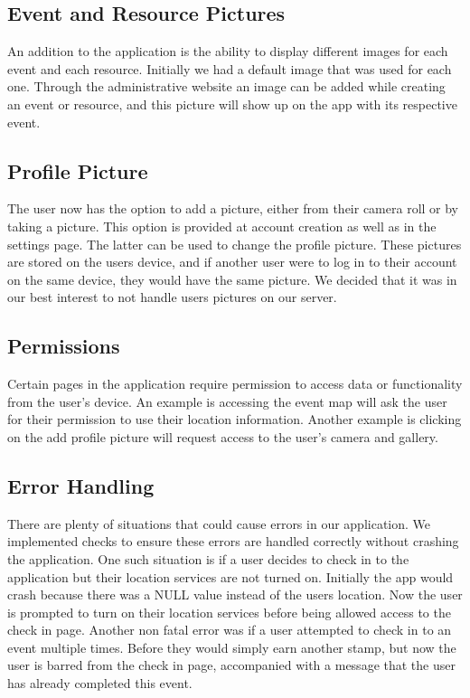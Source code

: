 \documentclass[onecolumn, draftclsnofoot,10pt, compsoc]{IEEEtran}
\begin{document}
  \subsection{Event and Resource Pictures}
  An addition to the application is the ability to display different images for each event and each resource. Initially we had a default image that was used for each one.
  Through the administrative website an image can be added while creating an event or resource, and this picture will show up on the app with its respective event.

  \subsection{Profile Picture}
  The user now has the option to add a picture, either from their camera roll or by taking a picture. This option is provided at account creation as well as in the settings
  page. The latter can be used to change the profile picture. These pictures are stored on the users device, and if another user were to log in to their account on the
  same device, they would have the same picture. We decided that it was in our best interest to not handle users pictures on our server.

  \subsection{Permissions}
  Certain pages in the application require permission to access data or functionality from the user's device. An example is accessing the event map will ask the user for their
  permission to use their location information. Another example is clicking on the add profile picture will request access to the user's camera and gallery.

  \subsection{Error Handling}
  There are plenty of situations that could cause errors in our application. We implemented checks to ensure these errors are handled correctly without crashing
  the application. One such situation is if a user decides to check in to the application but their location services are not turned on. Initially the app would crash
  because there was a NULL value instead of the users location. Now the user is prompted to turn on their location services before being allowed access to the check
  in page. Another non fatal error was if a user attempted to check in to an event multiple times. Before they would simply earn another stamp, but now the user is
  barred from the check in page, accompanied with a message that the user has already completed this event.
\end{document}
